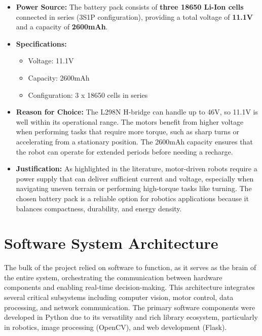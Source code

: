 \begin{itemize}
	\item \textbf{Power Source:} The battery pack consists of \textbf{three 18650 Li-Ion cells} connected in series (3S1P configuration), providing a total voltage of \textbf{11.1V} and a capacity of \textbf{2600mAh}.
	
	\item \textbf{Specifications:}
	\begin{itemize}
		\item Voltage: 11.1V
		\item Capacity: 2600mAh
		\item Configuration: 3 x 18650 cells in series
	\end{itemize}
	
	\item \textbf{Reason for Choice:} The L298N H-bridge can handle up to 46V, so 11.1V is well within its operational range. The motors benefit from higher voltage when performing tasks that require more torque, such as sharp turns or accelerating from a stationary position. The 2600mAh capacity ensures that the robot can operate for extended periods before needing a recharge.
	
	\item \textbf{Justification:} As highlighted in the literature, motor-driven robots require a power supply that can deliver sufficient current and voltage, especially when navigating uneven terrain or performing high-torque tasks like turning. The chosen battery pack is a reliable option for robotics applications because it balances compactness, durability, and energy density.
\end{itemize}

\section{\label{sec:software} Software System Architecture}

The bulk of the project relied on software to function, as it serves as the brain of the entire system, orchestrating the communication between hardware components and enabling real-time decision-making. This architecture integrates several critical subsystems including computer vision, motor control, data processing, and network communication. The primary software components were developed in Python due to its versatility and rich library ecosystem, particularly in robotics, image processing (OpenCV), and web development (Flask).


